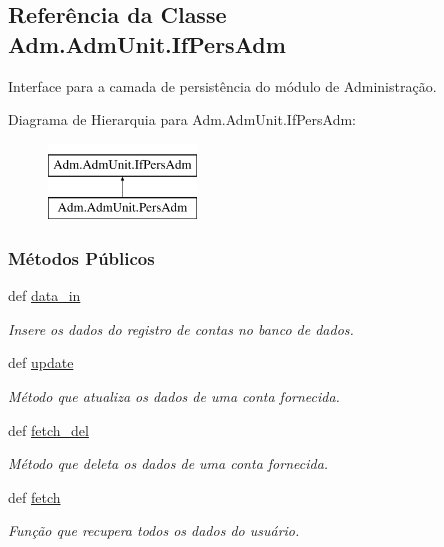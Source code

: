 \hypertarget{classAdm_1_1AdmUnit_1_1IfPersAdm}{\subsection{Referência da Classe Adm.\-Adm\-Unit.\-If\-Pers\-Adm}
\label{classAdm_1_1AdmUnit_1_1IfPersAdm}
}


Interface para a camada de persistência do módulo de Administração.  


Diagrama de Hierarquia para Adm.\-Adm\-Unit.\-If\-Pers\-Adm\-:\begin{figure}[H]
\begin{center}
\leavevmode
\includegraphics[height=2.000000cm]{d0/dce/classAdm_1_1AdmUnit_1_1IfPersAdm}
\end{center}
\end{figure}
\subsubsection*{Métodos Públicos}
\begin{DoxyCompactItemize}
\item 
def \hyperlink{classAdm_1_1AdmUnit_1_1IfPersAdm_a42e24568a80eac498b0bc7a29b0b11ac}{data\-\_\-in}
\begin{DoxyCompactList}\small\item\em Insere os dados do registro de contas no banco de dados. \end{DoxyCompactList}\item 
def \hyperlink{classAdm_1_1AdmUnit_1_1IfPersAdm_aafad401f6000d8b27a33af9b461e4f0a}{update}
\begin{DoxyCompactList}\small\item\em Método que atualiza os dados de uma conta fornecida. \end{DoxyCompactList}\item 
def \hyperlink{classAdm_1_1AdmUnit_1_1IfPersAdm_a341a3ec120277ad9638e2c1bd0f8a56f}{fetch\-\_\-del}
\begin{DoxyCompactList}\small\item\em Método que deleta os dados de uma conta fornecida. \end{DoxyCompactList}\item 
def \hyperlink{classAdm_1_1AdmUnit_1_1IfPersAdm_a7870c402c99499af2952e0820bc6c7a3}{fetch}
\begin{DoxyCompactList}\small\item\em Função que recupera todos os dados do usuário. \end{DoxyCompactList}\end{DoxyCompactItemize}



